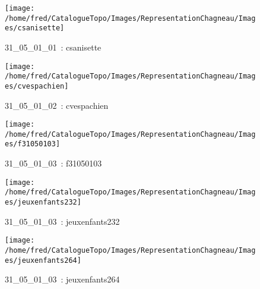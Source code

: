 \documentclass[12pt,titlepage]{book}
\begin{document}
\begin{figure}[h!]
  \hfill         %
  \begin{minipage}[t]{3cm}
    \begin{center}
      \texttt{[image: /home/fred/CatalogueTopo/Images/RepresentationChagneau/Images/csanisette]}
      \caption[~31\_05\_01\_01]{\small{31\_05\_01\_01~:} \tiny{csanisette}}\label{csanisette}
    \end{center}
  \end{minipage}
  \begin{minipage}[t]{3cm}
    \begin{center}
      \texttt{[image: /home/fred/CatalogueTopo/Images/RepresentationChagneau/Images/cvespachien]}
      \caption[~31\_05\_01\_02]{\small{31\_05\_01\_02~:} \tiny{cvespachien}}\label{cvespachien}
    \end{center}
  \end{minipage}
  \begin{minipage}[t]{3cm}
    \begin{center}
      \texttt{[image: /home/fred/CatalogueTopo/Images/RepresentationChagneau/Images/f31050103]}
      \caption[~31\_05\_01\_03]{\small{31\_05\_01\_03~:} \tiny{f31050103}}\label{f31050103}
    \end{center}
  \end{minipage}
  \begin{minipage}[t]{3cm}
    \begin{center}
      \texttt{[image: /home/fred/CatalogueTopo/Images/RepresentationChagneau/Images/jeuxenfants232]}
      \caption[~31\_05\_01\_03]{\small{31\_05\_01\_03~:} \tiny{jeuxenfants232}}\label{jeuxenfants232}
    \end{center}
  \end{minipage}
  \begin{minipage}[t]{3cm}
    \begin{center}
      \texttt{[image: /home/fred/CatalogueTopo/Images/RepresentationChagneau/Images/jeuxenfants264]}
      \caption[~31\_05\_01\_03]{\small{31\_05\_01\_03~:} \tiny{jeuxenfants264}}\label{jeuxenfants264}
    \end{center}
  \end{minipage}
  \begin{minipage}[t]{3cm}

\end{minipage}
\end{figure}
\end{document}
